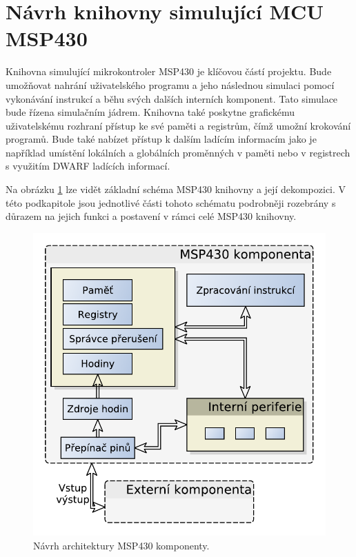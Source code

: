 \section{Návrh knihovny simulující MCU MSP430}

Knihovna simulující mikrokontroler MSP430 je klíčovou částí projektu. Bude umožňovat nahrání uživatelského programu a jeho
následnou simulaci pomocí vykonávání instrukcí a běhu svých dalších interních komponent. Tato simulace bude řízena simulačním jádrem. Knihovna také poskytne grafickému uživatelskému rozhraní přístup ke své paměti a registrům, čímž umožní krokování programů. Bude také nabízet přístup k dalším ladícím informacím jako je například umístění lokálních a globálních proměnných v paměti nebo v registrech s využitím DWARF ladících informací.

Na obrázku \ref{fig:msp430_arch} lze vidět základní schéma MSP430 knihovny a její dekompozici. V této podkapitole jsou jednotlivé části tohoto schématu podrobněji rozebrány s důrazem na jejich funkci a postavení v rámci celé MSP430 knihovny.

\begin{figure}[ht]
\centering
\includegraphics[trim=0cm 0cm 0cm 0cm, scale=0.7]{fig/msp430_arch}
\caption{Návrh architektury MSP430 komponenty.}
\label{fig:msp430_arch}
\end{figure}

